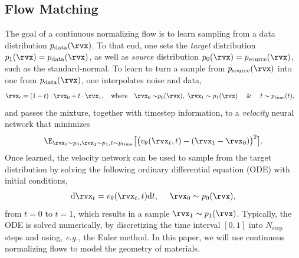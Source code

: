 \documentclass{article}
\theoremstyle{plain}
\theoremstyle{definition}
\theoremstyle{remark}
\begin{document}
\subsection{Flow Matching}
\label{subsec:flow}
The goal of a continuous normalizing flow \citep{lipman2022flow} is to learn sampling from a data distribution $p_{\text{data}}(\rvx)$. 
To that end, one sets the \emph{target} distribution $p_{1}(\rvx)=p_{\text{data}}(\rvx)$, as well as \emph{source} distribution $p_{0}(\rvx)=p_{\text{source}}(\rvx)$, such as the standard-normal. 
To learn to turn a sample from $p_{\text{source}}(\rvx)$ into one from $p_{\text{data}}(\rvx)$, one interpolates noise and data,
\begin{align}
    \rvx_t = (1-t) \cdot \rvx_0 + t \cdot \rvx_1, \quad \text{where} \quad \rvx_{0} \sim &p_{0}(\rvx), \ \rvx_1 \sim p_{1}(\rvx) \ \ \ \ \& \ \ \ \  t\sim p_{\text{time}}(t), \nonumber
\end{align}
and passes the mixture, together with timestep information, to a \emph{velocity} neural network that minimizes
\begin{align}
    \E_{\rvx_{0}\sim p_{0}, \rvx_{1}\sim p_1, t\sim p_{\text{time}}}\big[\big(v_{\theta}(\rvx_t, t) - (\rvx_1-\rvx_0)\big)^2\big]. \nonumber
\end{align}
Once learned, the velocity network can be used to sample from the target distribution by solving the following ordinary differential equation (ODE) with initial conditions,
\begin{align}
    \text{d}\rvx_t = v_{\theta}(\rvx_t, t) \text{d}t, \ \quad \rvx_{0}\sim p_{0}(\rvx), \nonumber
\end{align}
from $t=0$ to $t=1$, which results in a sample $\rvx_1 \sim p_{1}(\rvx)$.
Typically, the ODE is solved numerically, by discretizing the time interval $[0, 1]$ into $N_{\text{step}}$ steps and using, \emph{e.g.,} the Euler method.
In this paper, we will use continuous normalizing flows to model the geometry of materials.
\end{document}
